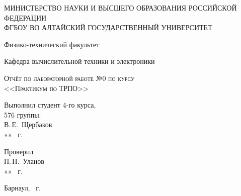 \documentclass[a4paper,14pt]{extarticle}
\begin{document}
\begin{titlepage}
  \begin{center}
    \MakeUppercase{Министерство науки и высшего образования Российской Федерации} \\
    \MakeUppercase{ФГБОУ ВО Алтайский государственный университет}
    \vspace{0.25cm}
    
    Физико-технический факультет
    
    Кафедра вычислительной техники и электроники
    \vfill
    
    \textsc{Отчёт по лабораторной работе №0 по курсу \\ <<Практикум по ТРПО>>}
  \bigskip

\end{center}
\vfill

\newlength{\ML}
\hfill\begin{minipage}{0.5\textwidth}
  Выполнил студент 4-го курса, \\ 576 группы:\\
  \underline{\hspace{\ML}} В.\,Е.~Щербаков\\
  «\underline{\hspace{0.7cm}}» \underline{\hspace{2cm}} \the\year~г.
\end{minipage}%
\bigskip

\hfill\begin{minipage}{0.5\textwidth}
  Проверил\\
  \underline{\hspace{\ML}} П.\,Н.~Уланов\\
  «\underline{\hspace{0.7cm}}» \underline{\hspace{2cm}} \the\year~г.
\end{minipage}%
\vfill

\begin{center}
  Барнаул, \the\year~г.
\end{center}
\end{titlepage}

\tableofcontents

\newpage
\end{document}
